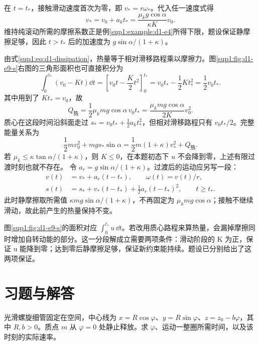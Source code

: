 \begin{solution}
在 $t=t_*$，接触滑动速度首次为零，即 $v_*=r\omega_*$。代入任一速度式得
\[
\boxed{v_*=v_0+a_kt_*
=\frac{\mu_kg\cos\alpha}{\kappa K}v_0}.
\]
维持纯滚动所需的摩擦系数正是例\ref{sup1:example:d1-e4}所得下限，题设保证静摩擦足够，因此 $t>t_*$ 后的加速度为 $g\sin\alpha/(1+\kappa)$。

由式\eqref{sup1:eq:d1-dissipation}，热量等于相对滑移路程乘以摩擦力。图\ref{sup1:fig:d1-e9-s}右图的三角形面积也可直接积分为
\[
\int_0^{t_*}(v_0-Kt)\dd t
=\left[v_0t-\frac K2t^2\right]_0^{t_*}
=v_0t_*-\frac12Kt_*^2=\frac12v_0t_*.
\]
其中用到了 $Kt_*=v_0$，故
\[
\boxed{Q_{\text{热}}=\frac12\mu_kmg\cos\alpha\,v_0t_*
=\frac{\mu_kmg\cos\alpha}{2K}v_0^2}.
\]
质心在这段时间沿斜面走过 $s_*=v_0t_*+\tfrac12a_kt_*^2$，但相对滑移路程只有 $v_0t_*/2$。完整能量关系为
\[
\frac12mv_0^2+mgs_*\sin\alpha
=\frac12m(1+\kappa)v_*^2+Q_{\text{热}}.
\]
若 $\mu_k\le\kappa\tan\alpha/(1+\kappa)$，则 $K\le0$，在本题初态下 $u$ 不会降到零，上述有限过渡时刻也就不存在。
令 $a_r=g\sin\alpha/(1+\kappa)$。过渡后的运动应另写一段：
\[
\begin{aligned}
v(t)&=v_*+a_r(t-t_*),\qquad \omega(t)=v(t)/r,\\
s(t)&=s_*+v_*(t-t_*)+\frac12a_r(t-t_*)^2,
\qquad t\ge t_*.
\end{aligned}
\]
此时静摩擦取所需值 $\kappa mg\sin\alpha/(1+\kappa)$，不再固定为 $\mu_kmg\cos\alpha$；接触不继续滑动，故此前产生的热量保持不变。

图\ref{sup1:fig:d1-e9-s}的面积对应 $\int_0^{t_*}u\,\dd t$。若改用质心路程来算热量，会漏掉摩擦同时增加自转动能的部分。这一分段解成立需要两项条件：滑动阶段的 K 为正，保证 u 能降到零；达到零后静摩擦足够，保证新约束能持续。题设已分别给出了这两项保证。

\end{solution}



\section{习题与解答}

\begin{exercise}[螺旋轨道上的下滑]\label{sup1:problem-exercise-1}\label{sup1:exercise:d1-p1}
光滑螺旋细管固定在空间，中心线为 $x=R\cos\varphi$、$y=R\sin\varphi$、$z=z_0-b\varphi$，其中 $R,b>0$。质点 $m$ 从 $\varphi=0$ 处静止释放。求 $\ddot\varphi$、运动一整圈所需时间，以及该时刻的实际速率。
\end{exercise}

